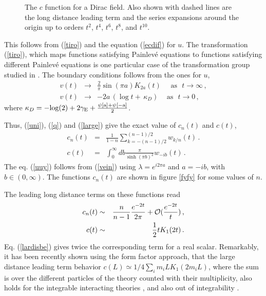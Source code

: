 \documentclass[11pt]{article}
\begin{document}
\begin{figure} [tbp]
\centering
\leavevmode
\epsfysize=5.5cm
\bigskip
{} 
\caption{The $c$ function for a Dirac field. Also shown with dashed lines are the long distance leading term and the series expansions around the origin up to orders $t^2$, $t^4$, $t^6$, $t^8$, and $t^{10}$.}
\label{fity}
\end{figure}

This follows from (\ref{tiro}) and the equation (\ref{ecdif}) for $u$. The transformation (\ref{tiro}), which maps functions satisfying Painlev\'e equations to functions satisfying different Painlev\'e equations is one particular case of the transformation group studied in \cite{rims2}. The boundary conditions follows from the ones for $u$,
\begin{eqnarray}
v(t) &\rightarrow &\frac{2}{\pi} \sin ( \pi a) K_{2a} (t)\,\,\,\,\,\,\,\, \textrm{as} \,\,\,\, t\rightarrow \infty \,,\label{large}\\
v(t)&\rightarrow& -2a \,(\log t+\,\kappa_D)\,\,\,\,\,\,\,\textrm{as}\,\,\,\,t\rightarrow 0 \label{fermion0}\,,
\end{eqnarray}
where   $
\kappa_D=\rm -log(2)+2{\gamma}_E+\frac{\psi[a]+\psi[-a]}{2}
$.

Thus, (\ref{uni}), (\ref{q}) and (\ref{large}) give the exact value of $c_n(t)$ and $c(t)$,
\begin{eqnarray}
c_n(t)&=&\frac{1}{1-n}\sum_{k=-(n-1)/2}^{(n-1)/2}w_{k/n}(t)\,.
\label{doblew}
\\
c(t)&=&\int_0^{\infty}db \frac{\pi}{\sinh(\pi b)^2}w_{-i b}(t)\,.\label{uuy}
\end{eqnarray}
The eq. (\ref{uuy}) follows from (\ref{vein}) using $\lambda=e^{i 2\pi a}$ and $a=-i b$, with $b\in (0,\infty)$. 
The functions $c_n(t)$ are shown in figure \ref{fyfy} for some values of $n$.

 The leading long distance terms on these functions read
\begin{eqnarray}
c_n(t) &\sim& \frac{n}{n-1}\frac{e^{-2t}}{2\pi}+{\cal O}(\frac{e^{-2t}}{t})\,,\label{distan}\\
 c(t)&\sim& \frac{1}{2} t K_1(2 t)\,.\label{lardisbe}
\end{eqnarray} 
Eq. (\ref{lardisbe}) gives twice the corresponding term for a real scalar. Remarkably, it has been recently shown using the form factor approach, that the large distance leading term behavior $c(L)\simeq 1/4\sum_i m_i L K_1(2 m_i L)$, where the sum is over the different particles of the theory counted with their multiplicity, also holds for the integrable interacting theories \cite{ccd}, and also out of integrability \cite{dy}.   
\end{document}
